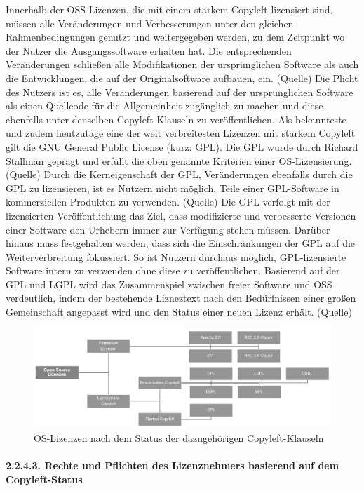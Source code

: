 Innerhalb der OSS-Lizenzen, die mit einem starkem Copyleft lizensiert sind, müssen alle Veränderungen und Verbesserungen unter den gleichen Rahmenbedingungen genutzt und weitergegeben werden, zu dem Zeitpunkt wo der Nutzer die Ausgangssoftware erhalten hat. Die entsprechenden Veränderungen schließen alle Modifikationen der ursprünglichen Software als auch die Entwicklungen, die auf der Originalsoftware aufbauen, ein. (Quelle) Die Plicht des Nutzers ist es, alle Veränderungen basierend auf der ursprünglichen Software als einen Quellcode für die Allgemeinheit zugänglich zu machen und diese ebenfalls unter denselben Copyleft-Klauseln zu veröffentlichen. Als bekannteste und zudem heutzutage eine der weit verbreitesten Lizenzen mit starkem Copyleft gilt die GNU General Public License (kurz: GPL). Die GPL wurde durch Richard Stallman geprägt und erfüllt die oben genannte Kriterien einer OS-Lizensierung. (Quelle) Durch die Kerneigenschaft der GPL, Veränderungen ebenfalls durch die GPL zu lizensieren, ist es Nutzern nicht möglich, Teile einer GPL-Software in kommerziellen Produkten zu verwenden. (Quelle) Die GPL verfolgt mit der lizensierten Veröffentlichung das Ziel, dass modifizierte und verbesserte Versionen einer Software den Urhebern immer zur Verfügung stehen müssen. Darüber hinaus muss festgehalten werden, dass sich die Einschränkungen der GPL auf die Weiterverbreitung fokussiert. So ist Nutzern durchaus möglich, GPL-lizensierte Software intern zu verwenden ohne diese zu veröffentlichen. Basierend auf der GPL und LGPL wird das Zusammenspiel zwischen freier Software und OSS verdeutlich, indem der bestehende Lizneztext nach den Bedürfnissen einer großen Gemeinschaft angepasst wird und den Status einer neuen Lizenz erhält. (Quelle)

\begin{figure}[h]
    \centering
    \includegraphics[scale=0.55]{Bilder/Lizenzenvarianten.png}
    \caption{OS-Lizenzen nach dem Status der dazugehörigen Copyleft-Klauseln}
\end{figure}

\paragraph{2.2.4.3. Rechte und Pflichten des Lizenznehmers basierend auf dem Copyleft-Status}$~$

